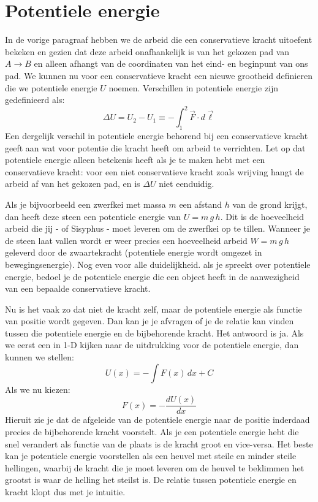 \section{Potentiele energie}

In de vorige paragraaf hebben we de arbeid die een conservatieve kracht uitoefent bekeken en
gezien dat deze arbeid onafhankelijk is van het gekozen pad van $A\rightarrow B$ en alleen
afhangt van de coordinaten van het eind- en beginpunt van ons pad. We kunnen nu voor 
een conservatieve kracht een nieuwe grootheid definieren die we potentiele energie $U$ noemen.
Verschillen in potentiele energie zijn gedefinieerd als:
\begin{equation}
\Delta U = U_2 - U_1 \equiv -\int_1^2\vec{F}\cdot d\vec{\ell} 
\end{equation}
Een dergelijk verschil in potentiele energie behorend bij een conservatieve kracht geeft aan wat
voor potentie die kracht heeft om arbeid te verrichten. Let op dat potentiele energie alleen betekenis heeft
als je te maken hebt met een conservatieve kracht: voor een niet conservatieve kracht zoals wrijving hangt 
de arbeid af van het gekozen pad, en is $\Delta U$ niet eenduidig.

Als je bijvoorbeeld een zwerfkei met massa $m$ een afstand $h$ van de grond krijgt, dan
heeft deze steen een potentiele energie van $U = m\,g\,h$. Dit is de hoeveelheid arbeid die
jij - of Sisyphus - moet leveren om de zwerfkei op te tillen. Wanneer je de steen laat vallen wordt 
er weer precies een hoeveelheid arbeid $W=m\,g\,h$ geleverd door de zwaartekracht (potentiele
energie wordt omgezet in bewegingsenergie).  Nog even voor alle duidelijkheid. als je spreekt
over potentiele energie, bedoel je de potentiele energie die een object heeft in de aanwezigheid
van een bepaalde conservatieve kracht.

Nu is het vaak zo dat niet de kracht zelf, maar de potentiele energie als functie van positie
wordt gegeven. Dan kan je je afvragen of je de relatie kan vinden tussen die potentiele energie
en de bijbehorende kracht. Het antwoord is ja. Als we eerst een in 1-D kijken naar de uitdrukking
voor de potentiele energie, dan kunnen we stellen:
\begin{equation}
U(x) = -\int F(x)\,dx + C
\end{equation}
Als we nu kiezen:
\begin{equation}
F(x) = -\frac{dU(x)}{dx}
\end{equation}
Hieruit zie je dat de afgeleide van de potentiele energie naar de positie inderdaad precies de bijbehorende
kracht voorstelt. Als je een potentiele energie hebt die snel verandert als functie van de plaats is de 
kracht groot en vice-versa. Het beste kan je potentiele energie voorstellen als een heuvel met steile en minder steile
hellingen, waarbij de kracht die je moet leveren om de heuvel te beklimmen het grootst
is waar de helling het steilst is. De relatie tussen potentiele energie en kracht klopt dus met je intuitie.

